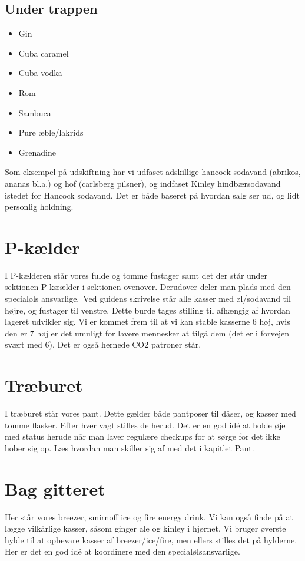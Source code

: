 \subsection{Under trappen}
\begin{itemize}
    \item Gin 
    \item Cuba caramel  
    \item Cuba vodka 
    \item Rom 
    \item Sambuca
    \item Pure æble/lakrids
    \item Grenadine
\end{itemize}

Som eksempel på udskiftning har vi udfaset adskillige hancock-sodavand (abrikos, ananas bl.a.) og hof (carlsberg pilsner), og indfaset Kinley hindbærsodavand istedet for Hancock sodavand. Det er både baseret på hvordan salg ser ud, og lidt personlig holdning.

\section{P-kælder}
  I P-kælderen står vores fulde og tomme fustager samt det der står under sektionen P-kæælder i sektionen ovenover. Derudover deler man plads med den specialøls ansvarlige.\ 
  Ved guidens skrivelse står alle kasser med øl/sodavand til højre, og fustager til venstre. Dette burde tages stilling til afhængig af hvordan lageret udvikler sig.
  Vi er kommet frem til at vi kan stable kasserne 6 høj, hvis den er 7 høj er det umuligt for lavere mennesker at tilgå dem (det er i forvejen svært med 6).
  Det er også hernede CO2 patroner står.


\section{Træburet}
I træburet står vores pant. Dette gælder både pantposer til dåser, og kasser med tomme flasker. Efter hver vagt stilles de herud. Det er en god idé at holde øje med status herude når man laver regulære checkups for at sørge for det ikke hober sig op. Læs hvordan man skiller sig af med det i kapitlet Pant.

\section{Bag gitteret}
Her står vores breezer, smirnoff ice og fire energy drink. Vi kan også finde på at lægge vilkårlige kasser, såsom ginger ale og kinley i hjørnet. Vi bruger øverste hylde til at opbevare kasser af breezer/ice/fire, men ellers stilles det på hylderne. Her er det en god idé at koordinere med den specialølsansvarlige.
\ 

